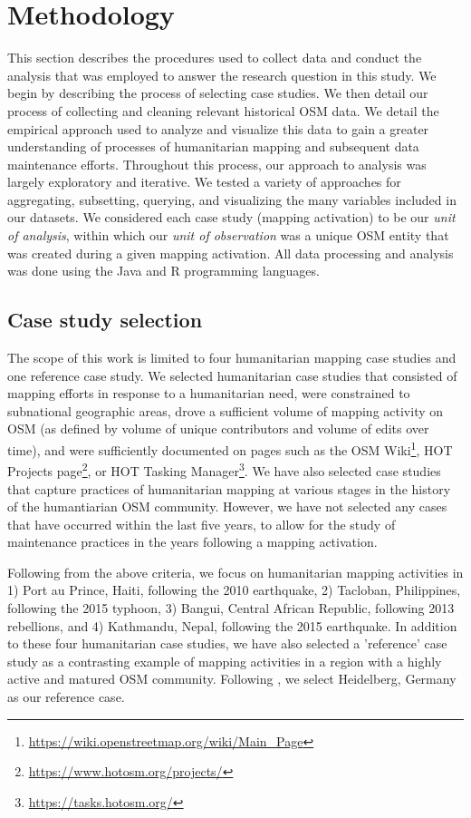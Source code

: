\chapter{Methodology}
\label{chapterlabel4}

This section describes the procedures used to collect data and conduct the analysis that was employed to answer the research question in this study. We begin by describing the process of selecting case studies. We then detail our process of collecting and cleaning relevant historical OSM data. We detail the empirical approach used to analyze and visualize this data to gain a greater understanding of processes of humanitarian mapping and subsequent data maintenance efforts. Throughout this process, our approach to analysis was largely exploratory and iterative. We tested a variety of approaches for aggregating, subsetting, querying, and visualizing the many variables included in our datasets. We considered each case study (mapping activation) to be our \textit{unit of analysis}, within which our \textit{unit of observation} was a unique OSM entity that was created during a given mapping activation. All data processing and analysis was done using the Java and R programming languages.

\section{Case study selection}

The scope of this work is limited to four humanitarian mapping case studies and one reference case study. We selected humanitarian case studies that consisted of mapping efforts in response to a humanitarian need, were constrained to subnational geographic areas, drove a sufficient volume of mapping activity on OSM (as defined by volume of unique contributors and volume of edits over time), and were sufficiently documented on pages such as the OSM Wiki\footnote{\url{https://wiki.openstreetmap.org/wiki/Main_Page}}, HOT Projects page\footnote{\url{https://www.hotosm.org/projects/}}, or HOT Tasking Manager\footnote{\url{https://tasks.hotosm.org/}}. We have also selected case studies that capture practices of humanitarian mapping at various stages in the history of the humantiarian OSM community. However, we have not selected any cases that have occurred within the last five years, to allow for the study of maintenance practices in the years following a mapping activation.  

Following from the above criteria, we focus on humanitarian mapping activities in 1) Port au Prince, Haiti, following the 2010 earthquake, 2) Tacloban, Philippines, following the 2015 typhoon, 3) Bangui, Central African Republic, following 2013 rebellions, and 4) Kathmandu, Nepal, following the 2015 earthquake. In addition to these four humanitarian case studies, we have also selected a 'reference' case study as a contrasting example of mapping activities in a region with a highly active and matured OSM community. Following \textcite{anderson_crowd_2018}, we select Heidelberg, Germany as our reference case.

